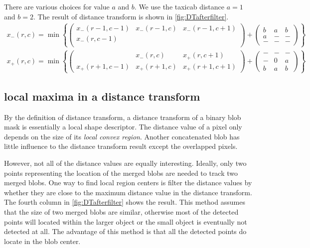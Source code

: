 There are various choices for value $a$ and $b$. We use the taxicab distance $a=1$ and $b=2$. The result of distance transform is shown in \autoref{fig:DTafterfilter}.
\begin{align}\label{eq:chamferDT}
  x_-(r,c) = \min\left\{\left(\begin{array}{ccc}
                          x_-(r-1,c-1) & x_-(r-1,c) & x_-(r-1,c+1) \\
                          x_-(r,c-1)\\
                        \end{array}  \right)+
                        \begin{pmatrix}
                          b & a & b \\
                          a & - & - \\
                          - & - & -
                        \end{pmatrix} \right\}
\\
  x_+(r,c) = \min\left\{
            \left(\begin{array}{ccc}
                         &x_-(r,c)&x_+(r,c+1)\\
            x_+(r+1,c-1)& x_+(r+1,c) &x_+(r+1,c+1)
                        \end{array}
                        \right)+
                        \begin{pmatrix}
                          - & - & - \\
                          - & 0 & a \\
                          b & a & b
                        \end{pmatrix}
                        \right\}
\end{align}
\subsection{local maxima in a distance transform}
By the definition of distance transform, a distance transform of a binary blob mask is essentially a local shape descriptor. The distance value of a pixel only depends on the size of its \emph{local convex region}. Another concatenated blob has little influence to the distance transform result except the overlapped pixels.

However, not all of the distance values are equally interesting. Ideally, only two points representing the location of the merged blobs are needed to track two merged blobs. One way to find local region centers is filter the distance values by whether they are close to the maximum distance value in the distance transform. The fourth column in \autoref{fig:DTafterfilter} shows the result. This method assumes that the size of two merged blobs are similar, otherwise most of the detected points will located within the larger object or the small object is eventually not detected at all. The advantage of this method is that all the detected points do locate in the blob center.

